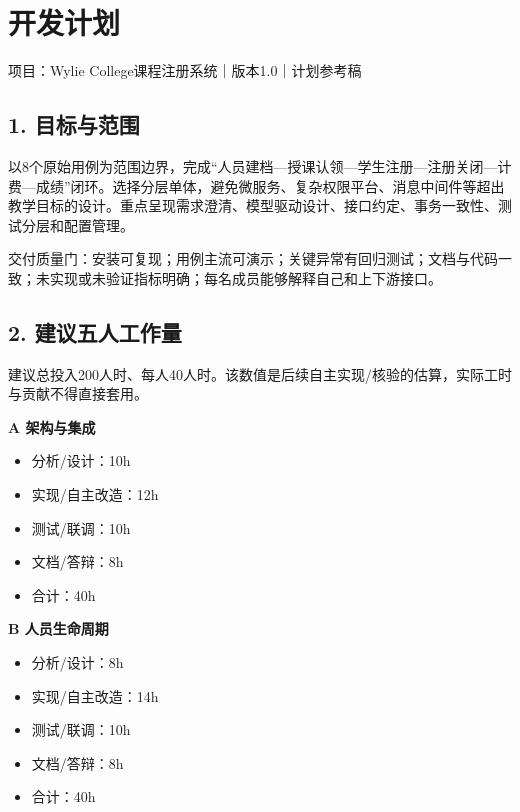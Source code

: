 \documentclass[UTF8,11pt,a4paper]{ctexart}
\providecommand{\tightlist}{\setlength{\itemsep}{0pt}\setlength{\parskip}{0pt}}
\begin{document}
\clearpage
\hypertarget{ux5f00ux53d1ux8ba1ux5212}{%
\section{开发计划}\label{ux5f00ux53d1ux8ba1ux5212}}

项目：Wylie College课程注册系统｜版本1.0｜计划参考稿

\hypertarget{1-ux76eeux6807ux4e0eux8303ux56f4}{%
\subsection{1. 目标与范围}\label{1-ux76eeux6807ux4e0eux8303ux56f4}}

以8个原始用例为范围边界，完成``人员建档---授课认领---学生注册---注册关闭---计费---成绩''闭环。选择分层单体，避免微服务、复杂权限平台、消息中间件等超出教学目标的设计。重点呈现需求澄清、模型驱动设计、接口约定、事务一致性、测试分层和配置管理。

交付质量门：安装可复现；用例主流可演示；关键异常有回归测试；文档与代码一致；未实现或未验证指标明确；每名成员能够解释自己和上下游接口。

\hypertarget{2-ux5efaux8baeux4e94ux4ebaux5de5ux4f5cux91cf}{%
\subsection{2.
建议五人工作量}\label{2-ux5efaux8baeux4e94ux4ebaux5de5ux4f5cux91cf}}

建议总投入200人时、每人40人时。该数值是后续自主实现/核验的估算，实际工时与贡献不得直接套用。

\textbf{A 架构与集成}

\begin{itemize}
\tightlist
\item
  分析/设计：10h
\item
  实现/自主改造：12h
\item
  测试/联调：10h
\item
  文档/答辩：8h
\item
  合计：40h
\end{itemize}

\textbf{B 人员生命周期}

\begin{itemize}
\tightlist
\item
  分析/设计：8h
\item
  实现/自主改造：14h
\item
  测试/联调：10h
\item
  文档/答辩：8h
\item
  合计：40h
\end{itemize}
\end{document}
